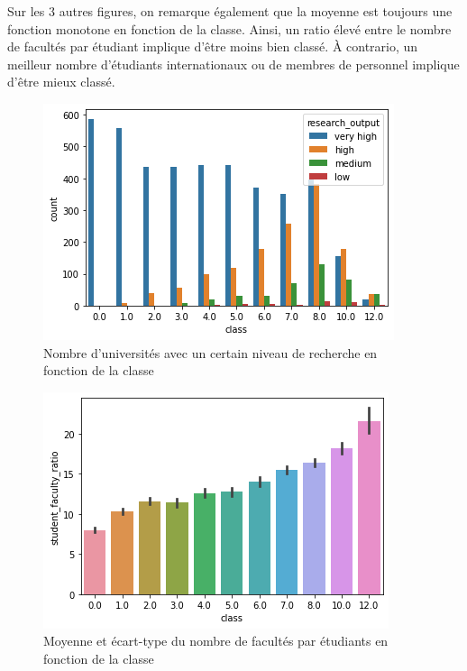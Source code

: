 \documentclass[twocolumns]{udes_rapport}
\begin{document}
    Sur les 3 autres figures, on remarque également que la moyenne est toujours une fonction monotone en fonction de la classe. Ainsi, un ratio élevé entre le nombre de facultés par étudiant implique d'être moins bien classé. À contrario, un meilleur nombre d'étudiants internationaux ou de membres de personnel implique d'être mieux classé.
    
    \begin{figure}[h!]
        \centering
        \includegraphics[scale=0.6]{Images/research_output_by_class.png}
        \caption{Nombre d'universités avec un certain niveau de recherche en fonction de la classe}
        \label{fig:research_output_by_class}
    \end{figure}
    
    \begin{figure}[h!]
        \centering
        \includegraphics[scale=0.6]{Images/student_faculty_ratio_by_class.png}
        \caption{Moyenne et écart-type du nombre de facultés par étudiants en fonction de la classe}
        \label{fig:student_faculty_ratio_by_class}
    \end{figure}
    
\end{document}
